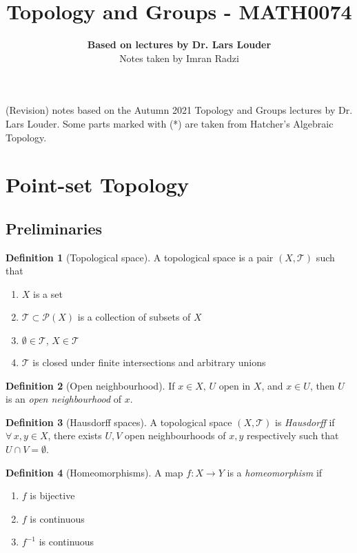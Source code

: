 \documentclass[a4paper,14pt]{extarticle}
\theoremstyle{definition}
\newtheorem*{definition}{Definition}
\begin{document}
\title{\textbf{Topology and Groups - MATH0074}}
\author{\textbf{Based on lectures by Dr. Lars Louder}\\ Notes taken by Imran Radzi}
\date{}
\maketitle

(Revision) notes based on the Autumn 2021 Topology and Groups lectures by Dr. Lars Louder.
Some parts marked with (*) are taken from Hatcher's Algebraic Topology.
\begingroup
\let\cleardoublepage\clearpage
\tableofcontents
\endgroup
\newpage
{}

\section{Point-set Topology}

\subsection{Preliminaries}
\begin{definition}[Topological space]
  A topological space is a pair $(X,\mathcal{T})$ such that
  \begin{enumerate}
    \item $X$ is a set 
    \item $\mathcal{T}\subset \mathcal{P}(X)$ is a collection of subsets of $X$
    \item $\emptyset\in\mathcal{T}, \,X\in\mathcal{T}$
    \item $\mathcal{T}$ is closed under finite intersections and arbitrary unions
  \end{enumerate}
\end{definition}

\begin{definition}[Open neighbourhood]
  If $x\in X, \,U$ open in $X$, and $x\in U$, then $U$ is an \emph{open neighbourhood} of $x$.
\end{definition}

\begin{definition}[Hausdorff spaces]
  A topological space $(X,\mathcal{T})$ is \emph{Hausdorff} if $\forall \,x,y\in X$, there 
  exists $U,V$ open neighbourhoods of $x,y$ respectively such that $U\cap V=\emptyset$.
\end{definition}

\begin{definition}[Homeomorphisms]
  A map $f:X\rightarrow Y$ is a \emph{homeomorphism} if 
  \begin{enumerate}
    \item $f$ is bijective
    \item $f$ is continuous
    \item $f^{-1}$ is continuous
  \end{enumerate}
\end{definition}
\end{document}
